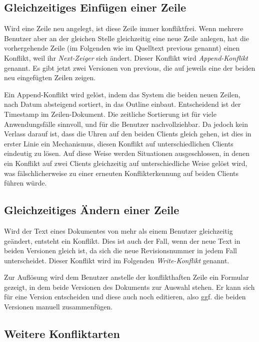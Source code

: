 \subsection{Gleichzeitiges Einfügen einer Zeile}
\label{subsec:appendkonfl-arch}

Wird eine Zeile neu angelegt, ist diese Zeile immer konfliktfrei. Wenn mehrere Benutzer aber an der gleichen Stelle gleichzeitig eine neue Zeile anlegen, hat die vorhergehende Zeile (im Folgenden wie im Quelltext {\selectfont previous} genannt) einen Konflikt, weil ihr \textit{Next-Zeiger} sich ändert. Dieser Konflikt wird \textit{Append-Konflikt} genannt. Es gibt jetzt zwei Versionen von {\selectfont previous}, die auf jeweils eine der beiden neu eingefügten Zeilen zeigen.

Ein Append-Konflikt wird gelöst, indem das System die beiden neuen Zeilen, nach Datum absteigend sortiert, in das Outline einbaut. Entscheidend ist der Timestamp im Zeilen-Dokument. Die zeitliche Sortierung ist für viele Anwendungsfälle sinnvoll, und für die Benutzer nachvollziehbar. Da jedoch kein Verlass darauf ist, dass die Uhren auf den beiden Clients gleich gehen, ist dies in erster Linie ein Mechanismus, diesen Konflikt auf unterschiedlichen Clients eindeutig zu lösen. Auf diese Weise werden Situationen ausgeschlossen, in denen ein Konflikt auf zwei Clients gleichzeitig auf unterschiedliche Weise gelöst wird, was fälschlicherweise zu einer erneuten Konflikterkennung auf beiden Clients führen würde. 

 
\subsection{Gleichzeitiges Ändern einer Zeile}
\label{subsec:writekonfl-arch}
 
Wird der Text eines Dokumentes von mehr als einem Benutzer gleichzeitig geändert, entsteht ein Konflikt. Dies ist auch der Fall, wenn der neue Text in beiden Versionen gleich ist, da sich die neue Revisionsnummer in jedem Fall unterscheidet. Dieser Konflikt wird im Folgenden \textit{Write-Konflikt} genannt.

Zur Auflösung wird dem Benutzer anstelle der konflikthaften Zeile ein Formular gezeigt, in dem beide Versionen des Dokuments zur Auswahl stehen. Er kann sich für eine Version entscheiden und diese auch noch editieren, also ggf. die beiden Versionen manuell zusammenfügen. 


\subsection{Weitere Konfliktarten}
\label{subsec:otherconflicts-design}

